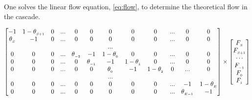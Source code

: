One solves the linear flow equation, \eqref{eq:flow}, to determine the
theoretical flow in the cascade.

\begin{equation}
\setcounter{MaxMatrixCols}{20}
\begin{bmatrix}
     -1        & 1-\theta_{_{S+1}} & 0 & ...  & 0              & 0              & 0                 & 0                 & 0                 & ...  & 0               & 0 \\
 \theta_{_{S}} & -1                & 0 & ...  & 0              & 0              & 0                 & 0                 & 0                 & ...  & 0               & 0 \\
               &                   &   &     &                &                & ...               &                   &                   &     &                 &   \\
 0             & 0                 & 0 & ...  & \theta_{_{-2}} & -1             & 1 - \theta_{_{0}} & 0                 & 0                 & ...  & 0               & 0 \\
 0             & 0                 & 0 & ...  & 0              & \theta_{_{-1}} & -1                & 1 - \theta_{_{1}} & 0                 & ...  & 0               & 0 \\
 0             & 0                 & 0 & ...  & 0              & 0              & \theta_{_{0}}     & -1                & 1 - \theta_{_{2}} & 0   & ...             & 0 \\
               &                   &   &     &                &                & ...               &                   &                   &     &                 &   \\
 0             & 0                 & 0 & ...  & 0              & 0              & 0                 & 0                 & 0                 & ...  & -1              & 1-\theta_{_{E}} \\
 0             & 0                 & 0 & ...  & 0              & 0              & 0                 & 0                 & 0                 & ...  & \theta_{_{E-1}} & -1
 \end{bmatrix}
 \times
 \begin{bmatrix}
     F_{_{S}}   \\
     F_{_{S+1}} \\
     \cdots     \\
     F_{_{-1}}  \\
     F_{_{0} }  \\
     F_{_{1} }  \\

\end{bmatrix}
\end{equation}
